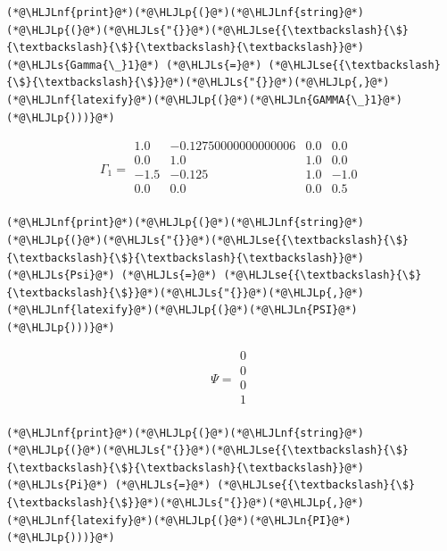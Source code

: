 \documentclass[12pt,a4paper]{article}
\newcommand{\HLJLn}[1]{#1}
\newcommand{\HLJLnf}[1]{\textcolor[RGB]{66,102,213}{#1}}
\newcommand{\HLJLs}[1]{\textcolor[RGB]{201,61,57}{#1}}
\newcommand{\HLJLse}[1]{\textcolor[RGB]{59,151,46}{#1}}
\newcommand{\HLJLp}[1]{#1}
\begin{document}
\begin{lstlisting}
(*@\HLJLnf{print}@*)(*@\HLJLp{(}@*)(*@\HLJLnf{string}@*)(*@\HLJLp{(}@*)(*@\HLJLs{"{}}@*)(*@\HLJLse{{\textbackslash}{\$}{\textbackslash}{\$}{\textbackslash}{\textbackslash}}@*)(*@\HLJLs{Gamma{\_}1}@*) (*@\HLJLs{=}@*) (*@\HLJLse{{\textbackslash}{\$}{\textbackslash}{\$}}@*)(*@\HLJLs{"{}}@*)(*@\HLJLp{,}@*)(*@\HLJLnf{latexify}@*)(*@\HLJLp{(}@*)(*@\HLJLn{GAMMA{\_}1}@*)(*@\HLJLp{)))}@*)
\end{lstlisting}

\begin{equation}
\Gamma_1 =
\begin{array}{cccc}
1.0 & -0.12750000000000006 & 0.0 & 0.0 \\
0.0 & 1.0 & 1.0 & 0.0 \\
-1.5 & -0.125 & 1.0 & -1.0 \\
0.0 & 0.0 & 0.0 & 0.5 \\
\end{array}
\end{equation}


\begin{lstlisting}
(*@\HLJLnf{print}@*)(*@\HLJLp{(}@*)(*@\HLJLnf{string}@*)(*@\HLJLp{(}@*)(*@\HLJLs{"{}}@*)(*@\HLJLse{{\textbackslash}{\$}{\textbackslash}{\$}{\textbackslash}{\textbackslash}}@*)(*@\HLJLs{Psi}@*) (*@\HLJLs{=}@*) (*@\HLJLse{{\textbackslash}{\$}{\textbackslash}{\$}}@*)(*@\HLJLs{"{}}@*)(*@\HLJLp{,}@*)(*@\HLJLnf{latexify}@*)(*@\HLJLp{(}@*)(*@\HLJLn{PSI}@*)(*@\HLJLp{)))}@*)
\end{lstlisting}

\begin{equation}
\Psi = 
\begin{array}{c}
0 \\
0 \\
0 \\
1 \\
\end{array}
\end{equation}


\begin{lstlisting}
(*@\HLJLnf{print}@*)(*@\HLJLp{(}@*)(*@\HLJLnf{string}@*)(*@\HLJLp{(}@*)(*@\HLJLs{"{}}@*)(*@\HLJLse{{\textbackslash}{\$}{\textbackslash}{\$}{\textbackslash}{\textbackslash}}@*)(*@\HLJLs{Pi}@*) (*@\HLJLs{=}@*) (*@\HLJLse{{\textbackslash}{\$}{\textbackslash}{\$}}@*)(*@\HLJLs{"{}}@*)(*@\HLJLp{,}@*)(*@\HLJLnf{latexify}@*)(*@\HLJLp{(}@*)(*@\HLJLn{PI}@*)(*@\HLJLp{)))}@*)
\end{lstlisting}
\end{document}
